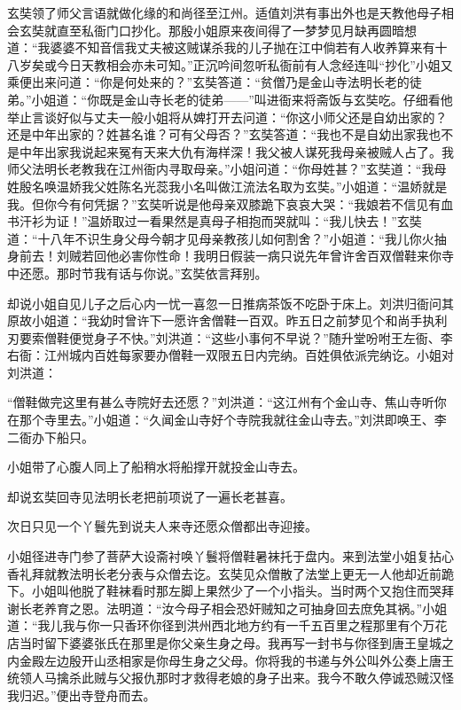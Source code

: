 \documentclass[12pt,UTF8]{ctexbook}
\begin{document}
玄奘领了师父言语就做化缘的和尚径至江州。适值刘洪有事出外也是天教他母子相会玄奘就直至私衙门口抄化。那殷小姐原来夜间得了一梦梦见月缺再圆暗想道：“我婆婆不知音信我丈夫被这贼谋杀我的儿子抛在江中倘若有人收养算来有十八岁矣或今日天教相会亦未可知。”正沉吟间忽听私衙前有人念经连叫“抄化”小姐又乘便出来问道：“你是何处来的？”玄奘答道：“贫僧乃是金山寺法明长老的徒弟。”小姐道：“你既是金山寺长老的徒弟——”叫进衙来将斋饭与玄奘吃。仔细看他举止言谈好似与丈夫一般小姐将从婢打开去问道：“你这小师父还是自幼出家的？还是中年出家的？姓甚名谁？可有父母否？”玄奘答道：“我也不是自幼出家我也不是中年出家我说起来冤有天来大仇有海样深！我父被人谋死我母亲被贼人占了。我师父法明长老教我在江州衙内寻取母亲。”小姐问道：“你母姓甚？”玄奘道：“我母姓殷名唤温娇我父姓陈名光蕊我小名叫做江流法名取为玄奘。”小姐道：“温娇就是我。但你今有何凭据？”玄奘听说是他母亲双膝跪下哀哀大哭：“我娘若不信见有血书汗衫为证！”温娇取过一看果然是真母子相抱而哭就叫：“我儿快去！”玄奘道：“十八年不识生身父母今朝才见母亲教孩儿如何割舍？”小姐道：“我儿你火抽身前去！刘贼若回他必害你性命！我明日假装一病只说先年曾许舍百双僧鞋来你寺中还愿。那时节我有话与你说。”玄奘依言拜别。

却说小姐自见儿子之后心内一忧一喜忽一日推病茶饭不吃卧于床上。刘洪归衙问其原故小姐道：“我幼时曾许下一愿许舍僧鞋一百双。昨五日之前梦见个和尚手执利刃要索僧鞋便觉身子不快。”刘洪道：“这些小事何不早说？”随升堂吩咐王左衙、李右衙：江州城内百姓每家要办僧鞋一双限五日内完纳。百姓俱依派完纳讫。小姐对刘洪道：

“僧鞋做完这里有甚么寺院好去还愿？”刘洪道：“这江州有个金山寺、焦山寺听你在那个寺里去。”小姐道：“久闻金山寺好个寺院我就往金山寺去。”刘洪即唤王、李二衙办下船只。

小姐带了心腹人同上了船稍水将船撑开就投金山寺去。

却说玄奘回寺见法明长老把前项说了一遍长老甚喜。

次日只见一个丫鬟先到说夫人来寺还愿众僧都出寺迎接。

小姐径进寺门参了菩萨大设斋衬唤丫鬟将僧鞋暑袜托于盘内。来到法堂小姐复拈心香礼拜就教法明长老分表与众僧去讫。玄奘见众僧散了法堂上更无一人他却近前跪下。小姐叫他脱了鞋袜看时那左脚上果然少了一个小指头。当时两个又抱住而哭拜谢长老养育之恩。法明道：“汝今母子相会恐奸贼知之可抽身回去庶免其祸。”小姐道：“我儿我与你一只香环你径到洪州西北地方约有一千五百里之程那里有个万花店当时留下婆婆张氏在那里是你父亲生身之母。我再写一封书与你径到唐王皇城之内金殿左边殷开山丞相家是你母生身之父母。你将我的书递与外公叫外公奏上唐王统领人马擒杀此贼与父报仇那时才救得老娘的身子出来。我今不敢久停诚恐贼汉怪我归迟。”便出寺登舟而去。
\end{document}
